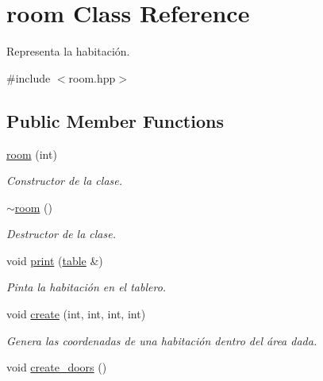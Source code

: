 \hypertarget{classroom}{\section{room Class Reference}
\label{classroom}
}


Representa la habitación.  




{\ttfamily \#include $<$room.\-hpp$>$}

\subsection*{Public Member Functions}
\begin{DoxyCompactItemize}
\item 
\hyperlink{classroom_ace9f88908f4096a844bcb1b950600ef5}{room} (int)
\begin{DoxyCompactList}\small\item\em Constructor de la clase. \end{DoxyCompactList}\item 
\hypertarget{classroom_a87f233e38131d61a1922b9b613a3bba5}{\hyperlink{classroom_a87f233e38131d61a1922b9b613a3bba5}{$\sim$room} ()}\label{classroom_a87f233e38131d61a1922b9b613a3bba5}

\begin{DoxyCompactList}\small\item\em Destructor de la clase. \end{DoxyCompactList}\item 
void \hyperlink{classroom_a92536abc8e5a388bc370a170a2e3e650}{print} (\hyperlink{classtable}{table} \&)
\begin{DoxyCompactList}\small\item\em Pinta la habitación en el tablero. \end{DoxyCompactList}\item 
void \hyperlink{classroom_a707be9da65fbe8d015eb0e3c5bae2aca}{create} (int, int, int, int)
\begin{DoxyCompactList}\small\item\em Genera las coordenadas de una habitación dentro del área dada. \end{DoxyCompactList}\item 
\hypertarget{classroom_a5a46993a29c3b7c60f8df16dd0ad4721}{void \hyperlink{classroom_a5a46993a29c3b7c60f8df16dd0ad4721}{create\-\_\-doors} ()}\label{classroom_a5a46993a29c3b7c60f8df16dd0ad4721}


\end{DoxyCompactItemize}
